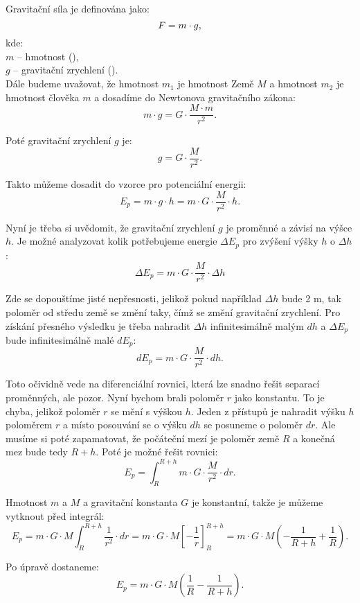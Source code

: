 \documentclass{article}
\begin{document}
Gravitační síla je definována jako:
\begin{equation}
    F = m \cdot g,
    \unit{(\ueqN)}
\end{equation}
kde:\\
$m$ -- hmotnost (\ueqKG),\\
$g$ -- gravitační zrychlení (\ueqMandSinvsq).\\

Dále budeme uvažovat, že hmotnost $m_1$ je hmotnost Země $M$ a hmotnost $m_2$ je hmotnost člověka $m$ a dosadíme do Newtonova gravitačního zákona:
$$
    m \cdot g = G \cdot \frac{M \cdot m}{r^2}.
$$

Poté gravitační zrychlení $g$ je:
$$
    g = G \cdot \frac{M}{r^2}.
$$

Takto můžeme dosadit do vzorce pro potenciální energii:
$$
    E_p = m \cdot g \cdot h = m \cdot G \cdot \frac{M}{r^2} \cdot h.
$$

Nyní je třeba si uvědomit, že gravitační zrychlení $g$ je proměnné a závisí na výšce $h$. Je možné analyzovat kolik potřebujeme energie $\Delta E_p$ pro zvýšení výšky $h$ o $\Delta h$:
$$
    \Delta E_p = m \cdot G \cdot \frac{M}{r^2} \cdot \Delta h
$$

Zde se dopouštíme jisté nepřesnosti, jelikož pokud například $\Delta h$ bude 2 m, tak poloměr od středu země se změní taky, čímž se změní gravitační zrychlení. Pro získání přesného výsledku je třeba nahradit $\Delta h$ infinitesimálně malým $dh$ a $\Delta E_p$ bude infinitesimálně malé $dE_p$:
$$
    dE_p = m \cdot G \cdot \frac{M}{r^2} \cdot dh.
$$

Toto očividně vede na diferenciální rovnici, která lze snadno řešit separací proměnných, ale pozor. Nyní bychom brali poloměr $r$ jako konstantu. To je chyba, jelikož poloměr $r$ se mění s výškou $h$. Jeden z přístupů je nahradit výšku $h$ poloměrem $r$ a místo posouvání se o výšku $dh$ se posuneme o poloměr $dr$. Ale musíme si poté zapamatovat, že počáteční mezí je poloměr země $R$ a konečná mez bude tedy $R + h$. Poté je možné řešit rovnici:
$$
    E_p = \int_{R}^{R + h} m \cdot G \cdot \frac{M}{r^2} \cdot dr.
$$

Hmotnost $m$ a $M$ a gravitační konstanta $G$ je konstantní, takže je můžeme vytknout před integrál:
$$
    E_p = m \cdot G \cdot M \int_{R}^{R + h} \frac{1}{r^2} \cdot dr = m \cdot G \cdot M \left[ - \frac{1}{r} \right]_{R}^{R + h} = m \cdot G \cdot M \left( - \frac{1}{R + h} + \frac{1}{R} \right).
$$

Po úpravě dostaneme:
$$
    E_p = m \cdot G \cdot M \left( \frac{1}{R} - \frac{1}{R + h} \right).
$$
\end{document}
